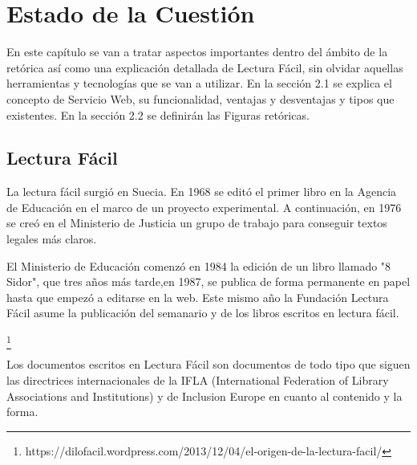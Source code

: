 \chapter{Estado de la Cuestión}
\label{cap:estadoDeLaCuestion}

\begin{resumen}
	En este capítulo se van a tratar aspectos importantes dentro del ámbito de la retórica así como una explicación detallada de Lectura Fácil, sin olvidar aquellas herramientas y tecnologías que se van a utilizar.
	En la sección 2.1 se explica el concepto de Servicio Web, su funcionalidad, ventajas y desventajas y tipos que existentes.
	En la sección 2.2 se definirán las Figuras retóricas.
\end{resumen}



\section{Lectura Fácil}


La lectura fácil surgió en Suecia. En 1968 se editó el primer libro en la Agencia de Educación en el marco de un proyecto experimental. A continuación, en 1976 se creó en el Ministerio de Justicia un grupo de trabajo para conseguir textos legales más claros.

El Ministerio de Educación comenzó en 1984 la edición de un libro llamado  "8 Sidor", que tres años más tarde,en 1987, se publica de forma permanente en papel hasta que empezó a editarse en la web. Este mismo año la Fundación Lectura Fácil asume la publicación del semanario y de los libros escritos en lectura fácil.


\footnote{https://dilofacil.wordpress.com/2013/12/04/el-origen-de-la-lectura-facil/}

Los documentos escritos en Lectura Fácil son documentos de todo tipo que siguen las directrices internacionales de la IFLA (International Federation of Library Associations and Institutions) y de Inclusion Europe en cuanto al contenido y la forma.

